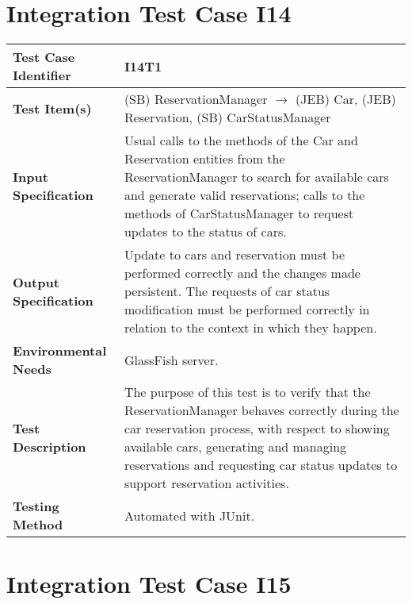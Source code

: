\section{Integration Test Case I14}

\begin{longtable}{p{} | p{}}
\hline
\textbf{Test Case Identifier} & I14T1\\
\hline
\textbf{Test Item(s)} & (SB) ReservationManager $\rightarrow$ (JEB) Car, (JEB) Reservation, (SB) CarStatusManager \\
\hline
\textbf{Input Specification} & Usual calls to the methods of the Car and Reservation entities from the ReservationManager to search for available cars and generate valid reservations; calls to the methods of CarStatusManager to request updates to the status of cars. \\
\hline
\textbf{Output Specification} & Update to cars and reservation must be performed correctly and the changes made persistent. The requests of car status modification must be performed correctly in relation to the context in which they happen. \\
\hline
\textbf{Environmental Needs} & GlassFish server. \\
\hline
\textbf{Test Description} & The purpose of this test is to verify that the ReservationManager behaves correctly during the car reservation process, with respect to showing available cars, generating and managing reservations and requesting car status updates to support reservation activities. \\
\hline
\textbf{Testing Method} & Automated with JUnit. \\
\hline
\end{longtable}

\section{Integration Test Case I15}

